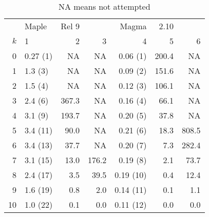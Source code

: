 \documentclass[10pt]{article}
\begin{document}
\begin{table}[htb]
\begin{center}
\begin{tabular}{r | l r r | r r r |}
   & Maple & Rel 9 &     & Magma & 2.10  & \\
$k$ &  1       &   2         &  3     &    4       &   5   &   6   \\ \hline
 0  & 0.27 (1) &   NA        & NA     &  0.06 (1)  & 200.4 &    NA \\
 1  & 1.3  (3) &   NA        & NA     &  0.09 (2)  & 151.6 &    NA \\
 2  & 1.5  (4) &   NA        & NA     &  0.12 (3)  & 106.1 &    NA \\
 3  & 2.4  (6) & 367.3       & NA     &  0.16 (4)  &  66.1 &    NA \\
 4  & 3.1  (9) & 193.7       & NA     &  0.20 (5)  &  37.8 &    NA \\
 5  & 3.4 (11) &  90.0       & NA     &  0.21 (6)  &  18.3 & 808.5 \\
 6  & 3.4 (13) &  37.7       & NA     &  0.20 (7)  &   7.3 & 282.4 \\
 7  & 3.1 (15) &  13.0       & 176.2  &  0.19 (8)  &   2.1 &  73.7 \\
 8  & 2.4 (17) &   3.5       &  39.5  &  0.19 (10) &   0.4 &  12.4 \\
 9  & 1.6 (19) &   0.8       &   2.0  &  0.14 (11) &   0.1 &   1.1 \\
10  & 1.0 (22) &   0.1       &   0.0  &  0.11 (12) &   0.0 &   0.0 \\ \hline
\end{tabular}
\caption{NA means not attempted}
\end{center}
\end{table}
\end{document}
